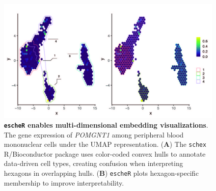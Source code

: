 \documentclass[10pt,twocolumn]{article}
\begin{document}
\begin{figure}[!h]
\begin{center}
\includegraphics[width=\textwidth]{Manuscript/figure/embedding.jpg}
\caption{\small \textbf{\texttt{escheR} enables multi-dimensional embedding visualizations}. The gene expression of \textit{POMGNT1} among peripheral blood mononuclear cells \cite{PBMC} under the UMAP representation. (\textbf{A}) The \texttt{schex} R/Bioconductor package uses color-coded convex hulls to annotate data-driven cell types, creating confusion when interpreting hexagons in overlapping hulls. (\textbf{B}) \texttt{escheR} plots hexagon-specific membership to improve interpretability.}
\label{fig:embedding} 
\end{center}
\end{figure}
\end{document}
